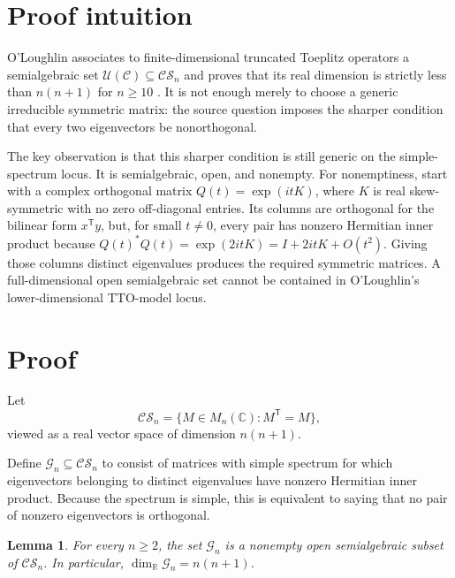 \documentclass[11pt]{article}
\newtheorem{lemma}{Lemma}
\newcommand{\CS}{\mathcal{CS}}
\newcommand{\Ucal}{\mathcal{U}}
\newcommand{\Ccal}{\mathcal{C}}
\newcommand{\T}{^{\mathsf T}}
\begin{document}
\section{Proof intuition}

O'Loughlin associates to finite-dimensional truncated Toeplitz operators a
semialgebraic set $\Ucal(\Ccal)\subseteq\CS_n$ and proves that its real
dimension is strictly less than $n(n+1)$ for $n\geq10$ \cite{OL}.  It is not
enough merely to choose a generic irreducible symmetric matrix: the source
question imposes the sharper condition that every two eigenvectors be
nonorthogonal.

The key observation is that this sharper condition is still generic on the
simple-spectrum locus.  It is semialgebraic, open, and nonempty.  For
nonemptiness, start with a complex orthogonal matrix
$Q(t)=\exp(itK)$, where $K$ is real skew-symmetric with no zero
off-diagonal entries.  Its columns are orthogonal for the bilinear form
$x\T y$, but, for small $t\ne0$, every pair has nonzero Hermitian inner
product because
$Q(t)^*Q(t)=\exp(2itK)=I+2itK+O(t^2)$.  Giving those columns distinct
eigenvalues produces the required symmetric matrices.  A full-dimensional
open semialgebraic set cannot be contained in O'Loughlin's
lower-dimensional TTO-model locus.

\section{Proof}

Let
\[
\CS_n=\{M\in M_n(\mathbb C):M\T=M\},
\]
viewed as a real vector space of dimension $n(n+1)$.

Define $\mathcal G_n\subseteq\CS_n$ to consist of matrices with simple
spectrum for which eigenvectors belonging to distinct eigenvalues have
nonzero Hermitian inner product.  Because the spectrum is simple, this is
equivalent to saying that no pair of nonzero eigenvectors is orthogonal.

\begin{lemma}\label{lem:generic}
For every $n\geq2$, the set $\mathcal G_n$ is a nonempty open
semialgebraic subset of $\CS_n$.  In particular,
$\dim_{\mathbb R}\mathcal G_n=n(n+1)$.
\end{lemma}
\end{document}
